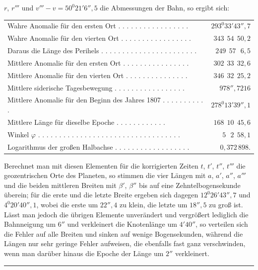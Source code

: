 $r$, $r'''$ und $v'''-v = 50^{0}21'6''{,}5$ die Abmessungen der Bahn,
so ergibt sich:
\begin{center}
\begingroup\fontsize{9}{11}\selectfont\setlength{\tabcolsep}{3pt}
\begin{tabular}{@{}lr@{}}
Wahre Anomalie für den ersten Ort . . . . . . . . . . . . . . . . . & $293^{0}33'43''{,}7$ \\
Wahre Anomalie für den vierten Ort . . . . . . . . . . . . . . . . . & $343\ \ 54\ \ 50{,}2$ \\
Daraus die Länge des Perihels . . . . . . . . . . . . . . . . . . . . . . . & $249\ \ 57\ \ \ 6{,}5$ \\
Mittlere Anomalie für den ersten Ort . . . . . . . . . . . . . . . . & $302\ \ 33\ \ 32{,}6$ \\
Mittlere Anomalie für den vierten Ort . . . . . . . . . . . . . . . & $346\ \ 32\ \ 25{,}2$ \\
Mittlere siderische Tagesbewegung . . . . . . . . . . . . . . . . . & $978''{,}7216$ \\
Mittlere Anomalie für den Beginn des Jahres 1807 . . . . . . . . . . . & $278^{0}13'39''{,}1$ \\
Mittlere Länge für dieselbe Epoche . . . . . . . . . . . . & $168\ \ 10\ \ 45{,}6$ \\
Winkel $\varphi$ . . . . . . . . . . . . . . . . . . . . . . . . . . . . . . . . . . & $5\ \ \ 2\ \ 58{,}1$ \\
Logarithmus der großen Halbachse . . . . . . . . . . . . . . . . . . & $0{,}372\,898.$
\end{tabular}\endgroup
\end{center}

Berechnet man mit diesen Elementen für die korrigierten Zeiten $t$, $t'$, $t''$, $t'''$
die geozentrischen Orte des Planeten, so stimmen die vier Längen mit $a$, $a'$,
$a''$, $a'''$ und die beiden mittleren Breiten mit $\beta'$, $\beta''$ bis auf
eine Zehntelbogensekunde überein; für die erste und die letzte Breite ergeben sich dagegen
$12^{0}26'43''{,}7$ und $4^{0}20'40''{,}1$, wobei die erste um $22''{,}4$
zu klein, die letzte um $18''{,}5$ zu groß ist. Lässt man jedoch die übrigen Elemente unverändert
und vergrößert lediglich die Bahnneigung um $6''$ und verkleinert die Knotenlänge um $4' 40''$,
so verteilen sich die Fehler auf alle Breiten und sinken auf wenige
Bogensekunden, während die Längen nur sehr geringe Fehler aufweisen,
die ebenfalls fast ganz verschwinden, wenn man darüber hinaus
die Epoche der Länge um $2''$ verkleinert.
\par\medskip\begin{center}\rule{.24\linewidth}{.35pt}\end{center}
